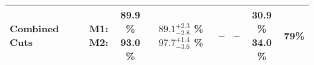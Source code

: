 \begin{tabular}{|>{\raggedright}m{3cm}|m{6cm}|c c c|c c|c|c|}
  Combined Cuts &  & \makecell{M1: \\ M2:} & \makecell{89.9 \% \\ 93.0 \%} & \makecell{$89.1^{+2.3}_{-2.8}$ \% \\ $97.7^{+1.4}_{-3.6}$ \%} & -- & -- & \makecell{30.9 \% \\ 34.0 \%} & 79\% \\
\hline
\end{tabular}
